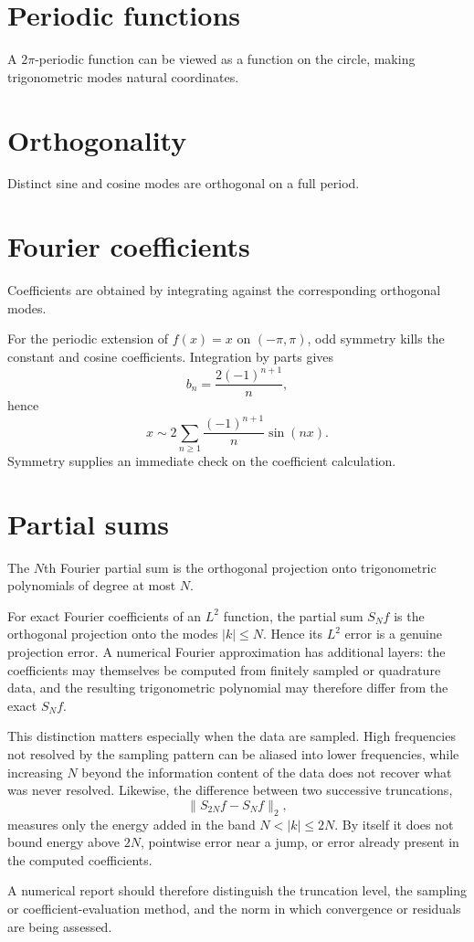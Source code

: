 \section{Periodic functions}
A $2\pi$-periodic function can be viewed as a function on the circle, making trigonometric modes natural coordinates.

\section{Orthogonality}
Distinct sine and cosine modes are orthogonal on a full period.

\section{Fourier coefficients}
Coefficients are obtained by integrating against the corresponding orthogonal modes.


\begin{example}\label{ex:iii09-expand-01}
For the periodic extension of \(f(x)=x\) on \((-\pi,\pi)\), odd symmetry
kills the constant and cosine coefficients. Integration by parts gives
\[
b_n=\frac{2(-1)^{n+1}}{n},
\]
hence
\[
x\sim2\sum_{n\ge1}\frac{(-1)^{n+1}}{n}\sin(nx).
\]
Symmetry supplies an immediate check on the coefficient calculation.
\end{example}
\section{Partial sums}
The $N$th Fourier partial sum is the orthogonal projection onto trigonometric polynomials of degree at most $N$.

\begin{remark}
For exact Fourier coefficients of an \(L^2\) function, the partial sum
\(S_Nf\) is the orthogonal projection onto the modes \(|k|\le N\).  Hence its
\(L^2\) error is a genuine projection error.  A numerical Fourier
approximation has additional layers: the coefficients may themselves be
computed from finitely sampled or quadrature data, and the resulting
trigonometric polynomial may therefore differ from the exact \(S_Nf\).

This distinction matters especially when the data are sampled.  High
frequencies not resolved by the sampling pattern can be aliased into lower
frequencies, while increasing \(N\) beyond the information content of the
data does not recover what was never resolved.  Likewise, the difference
between two successive truncations,
\[
\|S_{2N}f-S_Nf\|_2,
\]
measures only the energy added in the band \(N<|k|\le 2N\).  By itself it does
not bound energy above \(2N\), pointwise error near a jump, or error already
present in the computed coefficients.

A numerical report should therefore distinguish the truncation level, the
sampling or coefficient-evaluation method, and the norm in which convergence
or residuals are being assessed.
\end{remark}


